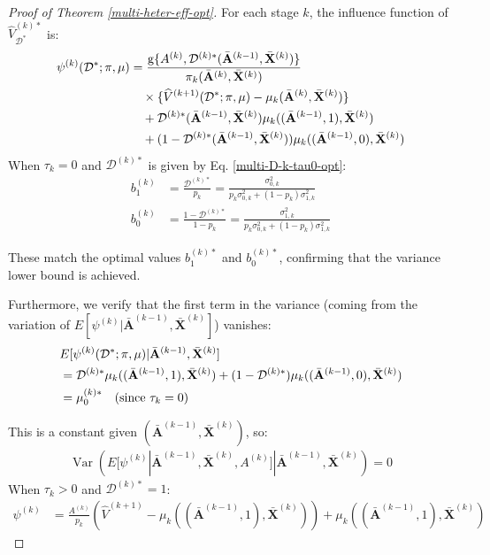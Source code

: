 \documentclass[11pt]{article}
\theoremstyle{referenceplain}
\theoremstyle{referencedefinition}
\theoremstyle{referenceremark}
\begin{document}
\begin{proof}[Proof of Theorem \ref{multi-heter-eff-opt}]
For each stage $k$, the influence function of $\widehat{V}_{\mathcal{D}^*}^{(k)*}$ is:
\begin{align}
    \psi^{(k)}(\mathcal{D}^*; \pi, \mu) &= \frac{\mathrm{g}\{A^{(k)}, \mathcal{D}^{(k)*}(\bar{\mathbf{A}}^{(k-1)}, \bar{\mathbf{X}}^{(k)})\}}{\pi_k(\bar{\mathbf{A}}^{(k)}, \bar{\mathbf{X}}^{(k)})} \notag\\
    &\quad \times \{\widehat{V}^{(k+1)}(\mathcal{D}^*; \pi, \mu) - \mu_k(\bar{\mathbf{A}}^{(k)}, \bar{\mathbf{X}}^{(k)})\} \notag\\
    &\quad + \mathcal{D}^{(k)*}(\bar{\mathbf{A}}^{(k-1)}, \bar{\mathbf{X}}^{(k)}) \mu_k((\bar{\mathbf{A}}^{(k-1)}, 1), \bar{\mathbf{X}}^{(k)}) \notag\\
    &\quad + (1-\mathcal{D}^{(k)*}(\bar{\mathbf{A}}^{(k-1)}, \bar{\mathbf{X}}^{(k)})) \mu_k((\bar{\mathbf{A}}^{(k-1)}, 0), \bar{\mathbf{X}}^{(k)})
\end{align}
When $\tau_k = 0$ and $\mathcal{D}^{(k)*}$ is given by Eq. \eqref{multi-D-k-tau0-opt}:
\begin{align}
    b_1^{(k)} &= \frac{\mathcal{D}^{(k)*}}{p_k} = \frac{\sigma_{0,k}^2}{p_k \sigma_{0,k}^2 + (1-p_k) \sigma_{1,k}^2} \\
    b_0^{(k)} &= \frac{1-\mathcal{D}^{(k)*}}{1-p_k} = \frac{\sigma_{1,k}^2}{p_k \sigma_{0,k}^2 + (1-p_k) \sigma_{1,k}^2}
\end{align}

These match the optimal values $b_1^{(k)*}$ and $b_0^{(k)*}$, confirming that the variance lower bound is achieved.

Furthermore, we verify that the first term in the variance (coming from the variation of $E[\psi^{(k)} | \bar{\mathbf{A}}^{(k-1)}, \bar{\mathbf{X}}^{(k)}]$) vanishes:
\begin{align}
    &E[\psi^{(k)}(\mathcal{D}^*; \pi, \mu) | \bar{\mathbf{A}}^{(k-1)}, \bar{\mathbf{X}}^{(k)}] \notag\\
    &= \mathcal{D}^{(k)*} \mu_k((\bar{\mathbf{A}}^{(k-1)}, 1), \bar{\mathbf{X}}^{(k)}) + (1-\mathcal{D}^{(k)*}) \mu_k((\bar{\mathbf{A}}^{(k-1)}, 0), \bar{\mathbf{X}}^{(k)}) \notag\\
    &= \mu_0^{(k)*} \quad (\text{since } \tau_k = 0)
\end{align}

This is a constant given $(\bar{\mathbf{A}}^{(k-1)}, \bar{\mathbf{X}}^{(k)})$, so:
\begin{align}
    \operatorname{Var}(E[\psi^{(k)} | \bar{\mathbf{A}}^{(k-1)}, \bar{\mathbf{X}}^{(k)}, A^{(k)}] | \bar{\mathbf{A}}^{(k-1)}, \bar{\mathbf{X}}^{(k)}) = 0
\end{align}
When $\tau_k > 0$ and $\mathcal{D}^{(k)*} = 1$:
\begin{align}
    \psi^{(k)} &= \frac{A^{(k)}}{p_k} (\widehat{V}^{(k+1)} - \mu_k((\bar{\mathbf{A}}^{(k-1)}, 1), \bar{\mathbf{X}}^{(k)})) + \mu_k((\bar{\mathbf{A}}^{(k-1)}, 1), \bar{\mathbf{X}}^{(k)})
\end{align}


\end{proof}
\end{document}
